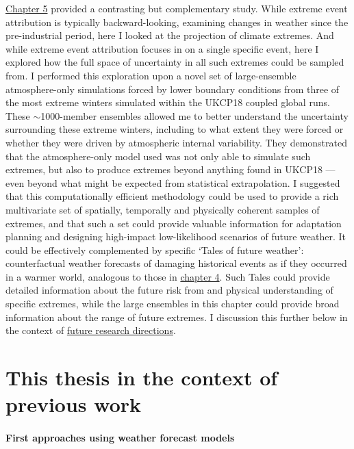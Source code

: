   \hyperref[ch5]{Chapter 5} provided a contrasting but complementary study. While extreme event attribution is typically backward-looking, examining changes in weather since the pre-industrial period, here I looked at the projection of climate extremes. And while extreme event attribution focuses in on a single specific event, here I explored how the full space of uncertainty in all such extremes could be sampled from. I performed this exploration upon a novel set of large-ensemble atmosphere-only simulations forced by lower boundary conditions from three of the most extreme winters simulated within the UKCP18 coupled global runs. These $\sim$1000-member ensembles allowed me to better understand the uncertainty surrounding these extreme winters, including to what extent they were forced or whether they were driven by atmospheric internal variability. They demonstrated that the atmosphere-only model used was not only able to simulate such extremes, but also to produce extremes beyond anything found in UKCP18 --- even beyond what might be expected from statistical extrapolation. I suggested that this computationally efficient methodology could be used to provide a rich multivariate set of spatially, temporally and physically coherent samples of extremes, and that such a set could provide valuable information for adaptation planning and designing high-impact low-likelihood scenarios of future weather. It could be effectively complemented by specific `Tales of future weather': counterfactual weather forecasts of damaging historical events as if they occurred in a warmer world, analogous to those in \hyperref[ch4]{chapter 4}. Such Tales could provide detailed information about the future risk from and physical understanding of specific extremes, while the large ensembles in this chapter could provide broad information about the range of future extremes. I discussion this further below in the context of \hyperref[discussion:future]{future research directions}.

\section{This thesis in the context of previous work}\label{discussion:context}

  \paragraph*{First approaches using weather forecast models}

